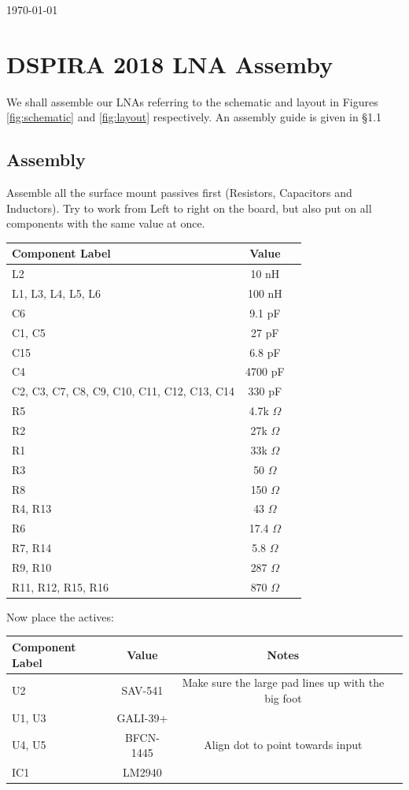 \documentclass[11pt,letterpaper]{article}
\begin{document}
{\Huge \today}\\[5mm] %

\section{DSPIRA 2018 LNA Assemby}

We shall assemble our LNAs referring to the schematic and layout in Figures \ref{fig:schematic} and \ref{fig:layout} respectively. An assembly guide is given in \S 1.1

\subsection{Assembly}

Assemble all the surface mount passives first (Resistors, Capacitors and Inductors). Try to work from Left to right on the board, but also put on all components with the same value at once.

\begin{tabular}{l|cc}
  Component Label & Value  \\
  \hline
  L2 &  10 nH \\
  L1, L3, L4, L5, L6 & 100 nH \\
  C6 &  9.1 pF \\
  C1, C5 & 27 pF \\
  C15 & 6.8 pF \\
  C4 & 4700 pF \\
  C2, C3, C7, C8, C9, C10, C11, C12, C13, C14 & 330 pF \\
  R5 & 4.7k $ \Omega $  \\
  R2 & 27k $ \Omega $ \\
  R1 & 33k $ \Omega $ \\
  R3 & 50 $ \Omega $ \\
  R8 & 150 $ \Omega $ \\
  R4, R13 & 43 $ \Omega $ \\
  R6 & 17.4 $ \Omega $ \\
  R7, R14 & 5.8 $ \Omega $ \\
  R9, R10 & 287 $ \Omega $ \\
  R11, R12, R15, R16 & 870 $ \Omega $ \\ 
  \hline
\end{tabular}

Now place the actives:

\begin{tabular}{l|ccc}
	Component Label & Value & Notes  \\
	\hline
	U2 & SAV-541 & Make sure the large pad lines up with the big foot \\
	U1, U3 & GALI-39+ & \\
	U4, U5  &  BFCN-1445 & Align dot to point towards input  \\
	IC1 & LM2940 & \\
	\hline
\end{tabular}
\end{document}
